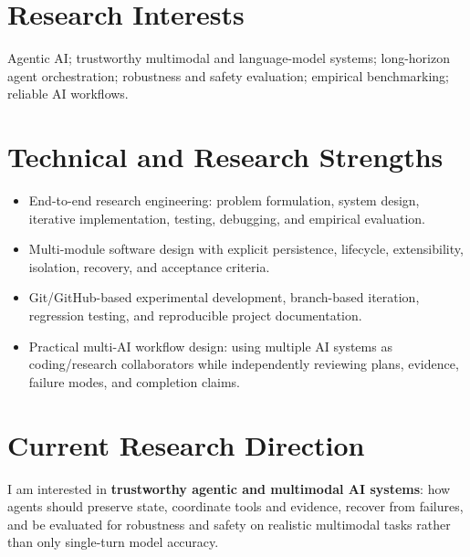 \documentclass[10pt,a4paper]{article}
\begin{document}
\section{Research Interests}
Agentic AI; trustworthy multimodal and language-model systems; long-horizon agent orchestration; robustness and safety evaluation; empirical benchmarking; reliable AI workflows.

\section{Technical and Research Strengths}
\begin{itemize}
  \item End-to-end research engineering: problem formulation, system design, iterative implementation, testing, debugging, and empirical evaluation.
  \item Multi-module software design with explicit persistence, lifecycle, extensibility, isolation, recovery, and acceptance criteria.
  \item Git/GitHub-based experimental development, branch-based iteration, regression testing, and reproducible project documentation.
  \item Practical multi-AI workflow design: using multiple AI systems as coding/research collaborators while independently reviewing plans, evidence, failure modes, and completion claims.
\end{itemize}

\section{Current Research Direction}
I am interested in \textbf{trustworthy agentic and multimodal AI systems}: how agents should preserve state, coordinate tools and evidence, recover from failures, and be evaluated for robustness and safety on realistic multimodal tasks rather than only single-turn model accuracy.
\end{document}
